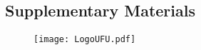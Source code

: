 \begin{appendices}

\chapter{Supplementary Materials}\label{app:SupplementaryMaterials}

\begin{figure}[!htbp] %
\centering
\texttt{[image: LogoUFU.pdf]}
\caption{\lipsum[1][1-3]}
\label{fig:LogoUFU}
\end{figure}

\end{appendices}
